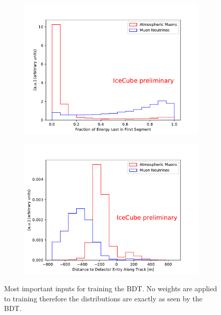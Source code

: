\documentclass{PoS}
\begin{document}
\begin{figure}[h!]
  \centering
  \begin{subfigure}[b]{0.49\linewidth}
    \includegraphics[width=\linewidth]{bdt_input_total_Fraction_of_Energy_Lost_in_First_Segment.pdf}
  \end{subfigure}
  \begin{subfigure}[b]{0.49\linewidth}
    \includegraphics[width=\linewidth]{bdt_input_total_Distance_to_Detector_Entry_Along_Track.pdf}
  \end{subfigure}
  \caption{Most important inputs for training the BDT. No weights are applied to training therefore the distributions are exactly as seen by the BDT.}
  \label{fig:BDTinputs}
\end{figure}
\end{document}
